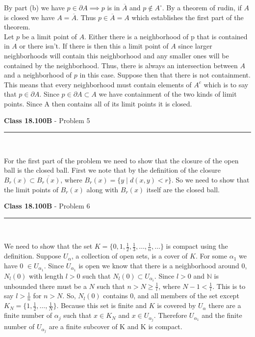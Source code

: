 \documentclass[11pt,reqno]{article}
\begin{document}
By part (b) we have $p \in \partial A \implies p$ is in $\overline{A}$ and $p \notin A^\circ$. By a theorem of rudin, if $A$ is closed we have $A = \overline{A}$. Thus $p \in \overline{A} = A$ which establishes the first part of the theorem.\\ 
\indent Let $p$ be a limit point of $A$. Either there is a neighborhood of p that is contained in $A$ or there isn't. If there is then this a limit point of $A$ since larger neighborhoods will contain this neighborhood and any smaller ones will be contained by the neighborhood. Thus, there is always an intersection between $A$ and a neighborhood of $p$ in this case. Suppose then that there is not containment. This means that every neighborhood must contain elements of $A^c$ which is to say that $p \in \partial A$. Since $p \in \partial A \subset A$ we have containment of the two kinds of limit points. Since A then contains all of its limit points it is closed.

\vspace{15pt}
\begin{flushleft} 
\textbf{Class 18.100B} - Problem 5\\
\rule{500pt}{1pt}\\
\end{flushleft} 

For the first part of the problem we need to show that the closure of the open ball is the closed ball. First we note that by the definition of the closure $B_r(x) \subset \overline{B_r(x)}$, where $B_r(x) = \{ y \; | \; d(x,y) < r\}$. So we need to show that the limit points of $B_r(x)$ along with $B_r(x)$ itself are the closed ball.  


\vspace{15pt}
\begin{flushleft} 
\textbf{Class 18.100B} - Problem 6\\
\rule{500pt}{1pt}\\
\end{flushleft} 

We need to show that the set $K = \{ 0,1,\frac{1}{2}, \frac{1}{3}, \ldots, \frac{1}{n}, \ldots \}$ is compact using the definition. Suppose $U_\alpha$, a collection of open sets, is a cover of $K$. For some $\alpha_1$ we have 0 $\in U_{\alpha_1}$. Since $U_{\alpha_1}$ is open we know that there is  a neighborhood around 0, $N_l(0)$ with length $l > 0$ such that $N_l(0) \subset U_{\alpha_i}$. Since $l > 0$ and $\mathbb{N}$ is unbounded there must be a $N$ such that $n > N \ge \frac{1}{l}$, where $N - 1 < \frac{1}{l}$. This is to say $l > \frac{1}{n}$ for $n > N$. So, $N_l(0)$ contains 0, and all members of the set except $K _N = \{1, \frac{1}{2}, \ldots, \frac{1}{N}\}$. Because this set is finite and $K$ is covered by $U_\alpha$ there are a finite number of $\alpha_j$ such that $x \in K_N$ and $x \in U_{\alpha_j}$.  Therefore $U_{\alpha_1}$ and the finite number of $U_{\alpha_j}$ are a finite subcover of K and K is compact.
\end{document}
